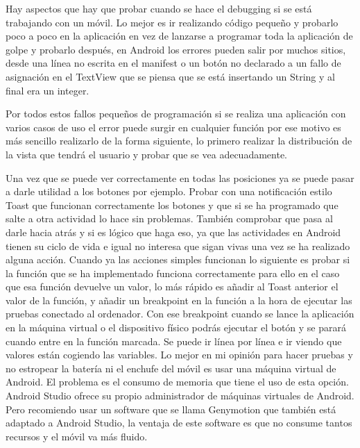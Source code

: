 Hay aspectos que hay que probar cuando se hace el debugging si se está trabajando con un móvil. Lo mejor es ir realizando código pequeño y probarlo poco a poco en la aplicación en vez de lanzarse a programar toda la aplicación de golpe y probarlo después, en Android los errores pueden salir por muchos sitios, desde una línea no escrita en el manifest o un botón no declarado a un fallo de asignación en el TextView que se piensa que se está insertando un String y al final era un integer.

Por todos estos fallos pequeños de programación si se realiza una aplicación con varios casos de uso el error puede surgir en cualquier función por ese motivo es más sencillo realizarlo de la forma siguiente, lo primero realizar la distribución de la vista que tendrá el usuario y probar que se vea adecuadamente.

Una vez que se puede ver correctamente en todas las posiciones ya se puede pasar a darle utilidad a los botones por ejemplo. Probar con una notificación estilo Toast que funcionan correctamente los botones y que si se ha programado que salte a otra actividad lo hace sin problemas. También comprobar que pasa al darle hacia atrás y si es lógico que haga eso, ya que las actividades en Android tienen su ciclo de vida e igual no interesa que sigan vivas una vez se ha realizado alguna acción.
Cuando ya las acciones simples funcionan lo siguiente es probar si la función que se ha implementado funciona correctamente para ello en el caso que esa función devuelve  un valor, lo más rápido es añadir al Toast anterior el valor de la función, y añadir un breakpoint en la función a la hora de ejecutar las pruebas conectado al ordenador.
Con ese breakpoint cuando se lance la aplicación en la máquina virtual o el dispositivo físico podrás ejecutar el botón y se parará cuando entre en la función marcada. Se puede ir línea por línea e ir viendo que valores están cogiendo las variables.
Lo mejor en mi opinión para hacer pruebas y no estropear la batería ni el enchufe del móvil es usar una máquina virtual de Android. El problema es el consumo de memoria que tiene el uso de esta opción. Android Studio ofrece su propio administrador de máquinas virtuales de Android. Pero recomiendo usar un software que se llama Genymotion que también está adaptado a Android Studio, la ventaja de este software es que no consume tantos recursos y el móvil va más fluido.

